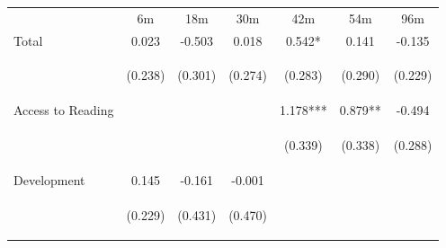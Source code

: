\begin{tabular}{lcccccc}
\hline \noalign{\smallskip} & 6m & 18m & 30m & 42m & 54m & 96m\\
\noalign{\smallskip}\hline \noalign{\smallskip}Total & 0.023 & -0.503 & 0.018 & 0.542* & 0.141 & -0.135\\
 & \begin{footnotesize}(0.238)\end{footnotesize} & \begin{footnotesize}(0.301)\end{footnotesize} & \begin{footnotesize}(0.274)\end{footnotesize} & \begin{footnotesize}(0.283)\end{footnotesize} & \begin{footnotesize}(0.290)\end{footnotesize} & \begin{footnotesize}(0.229)\end{footnotesize}\\
\noalign{\smallskip}Access to Reading &  &  &  & 1.178*** & 0.879** & -0.494\\
 & \begin{footnotesize}\end{footnotesize} & \begin{footnotesize}\end{footnotesize} & \begin{footnotesize}\end{footnotesize} & \begin{footnotesize}(0.339)\end{footnotesize} & \begin{footnotesize}(0.338)\end{footnotesize} & \begin{footnotesize}(0.288)\end{footnotesize}\\
\noalign{\smallskip}Development & 0.145 & -0.161 & -0.001 &  &  & \\
 & \begin{footnotesize}(0.229)\end{footnotesize} & \begin{footnotesize}(0.431)\end{footnotesize} & \begin{footnotesize}(0.470)\end{footnotesize} & \begin{footnotesize}\end{footnotesize} & \begin{footnotesize}\end{footnotesize} & \begin{footnotesize}\end{footnotesize}\\

\end{tabular}
